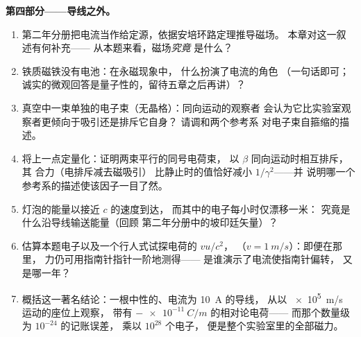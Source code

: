 \begin{problem}
\medskip\noindent\textbf{第四部分——导线之外。}
\begin{enumerate}[resume]
  \item 第二年分册把电流当作给定源，依据安培环路定理推导磁场。
        本章对这一叙述有何补充——
        从本题来看，磁场\emph{究竟}
        是什么？
  \item 铁质磁铁没有电池：在永磁现象中，
        什么扮演了电流的角色
        （一句话即可；诚实的微观回答是量子性的，留待五章之后再讲）？
  \item 真空中一束单独的电子束（无晶格）：同向运动的观察者
        会认为它比实验室观察者更倾向于吸引还是排斥它自身？
        请调和两个参考系
        对电子束自箍缩的描述。
  \item 将上一点定量化：证明两束平行的同号电荷束，
        以 $\beta$ 同向运动时相互排斥，其
        合力（电排斥减去磁吸引）
        比静止时的值恰好减小 $1/\gamma^2$——并
        说明哪一个参考系的描述使该因子一目了然。
  \item 灯泡的能量以接近 $c$ 的速度到达，
        而其中的电子每小时仅漂移一米：
        究竟是什么沿导线输送能量（回顾
        第二年分册中的坡印廷矢量）？
  \item 估算本题电子以及一个行人式试探电荷的 $vu/c^2$，
        （$v = \qty{1}{m/s}$）：即便在那里，
        力仍可用指南针指针一阶地测得——
        是谁演示了电流使指南针偏转，
        又是哪一年？
  \item 概括这一著名结论：一根中性的、电流为 \qty{10}{A} 的导线，
        从以 \qty{e5}{m/s} 运动的座位上观察，
        带有 $-\qty{e-11}{C/m}$ 的相对论电荷——
        而那个数量级为 $10^{-24}$ 的记账误差，
        乘以 $10^{28}$ 个电子，
        便是整个实验室里的全部磁力。
\end{enumerate}
\end{problem}
